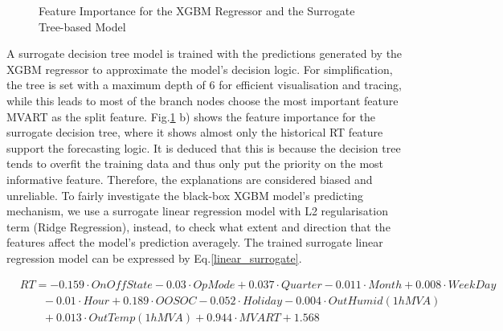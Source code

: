 \documentclass[11pt]{article}
\begin{document}
    \begin{figure}[htbp]
        \centering
        \caption{ Feature Importance for the XGBM Regressor and the Surrogate Tree-based Model}
        \label{Feature_importance}
    \end{figure}    
    
    A surrogate decision tree model is trained with the predictions generated by the XGBM regressor to approximate the model’s decision logic. For simplification, the tree is set with a maximum depth of 6 for efficient visualisation and tracing, while this leads to most of the branch nodes choose the most important feature MVART as the split feature. Fig.\ref{Feature_importance} b) shows the feature importance for the surrogate decision tree, where it shows almost only the historical RT feature support the forecasting logic. It is deduced that this is because the decision tree tends to overfit the training data and thus only put the priority on the most informative feature. Therefore, the explanations are considered biased and unreliable. To fairly investigate the black-box XGBM model’s predicting mechanism, we use a surrogate linear regression model with L2 regularisation term (Ridge Regression), instead, to check what extent and direction that the features affect the model’s prediction averagely. The trained surrogate linear regression model can be expressed by Eq.\ref{linear_surrogate}.
    
    \begin{equation}
        \label{linear_surrogate} 
        \begin{aligned}
            & RT=-0.159\cdot OnOffState-0.03\cdot OpMode+0.037\cdot Quarter-0.011\cdot Month +0.008\cdot WeekDay \\ 
            & \qquad -0.01\cdot Hour+ 0.189\cdot OOS OC-0.052\cdot Holiday -0.004\cdot OutHumid (1hMVA) \\ 
            & \qquad +0.013\cdot OutTemp(1hMVA) + 0.944\cdot MVART +1.568
        \end{aligned}
    \end{equation}    
    
\end{document}
